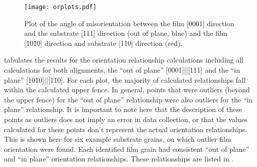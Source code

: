 \begin{figure}

	\begin{center}
\texttt{[image: orplots.pdf]}
		\caption[Plot of film-substrate misorientations]{%
			Plot of the angle of misorientation between the film
			[0001] direction and the substrate [111] direction (out of plane, 
			blue) and the film [10\={1}0] direction and substrate [1\={1}0] 
			direction (red).}
	\label{fig:orplots}
\end{center}
\end{figure}
 tabulates the results for the orientation relationship calculations
including all calculations for both alignments, the ``out of plane''
[0001]||[111] and the ``in plane''
[10\={1}0]||[1\={1}0]. For each plot, the majority of calculated
relationships fall within the calculated upper fence. In general, points that were
outliers (beyond the upper fence) for the ``out of plane'' relationship were also outliers
for the ``in plane'' relationship. It is important to note here that the description of
these points as outliers does not imply an error in data collection, or that the values
calculated for these points don't represent the actual orientation relationships. This is
shown here for six example substrate grains, on which outlier film orientation were found.
Each identified film grain had consistent ``out of plane'' and ``in plane'' orientation
relationships. These relationships are listed in .
